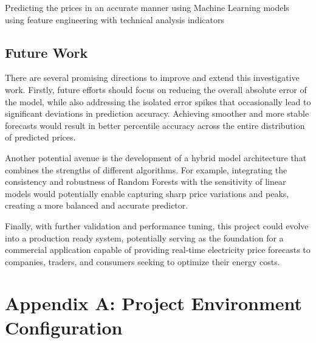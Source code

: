 \documentclass[12pt]{report} %
\begin{document}
Predicting the prices in an accurate manner using Machine Learning models using feature engineering with technical analysis indicators


\section{Future Work}
There are several promising directions to improve and extend this investigative work. Firstly, future efforts should focus on reducing the overall absolute error of the model, while also addressing the isolated error spikes that occasionally lead to significant deviations in prediction accuracy. Achieving smoother and more stable forecasts would result in better percentile accuracy across the entire distribution of predicted prices.

Another potential avenue is the development of a hybrid model architecture that combines the strengths of different algorithms. For example, integrating the consistency and robustness of Random Forests with the sensitivity of linear models would potentially enable capturing sharp price variations and peaks, creating a more balanced and accurate predictor.

Finally, with further validation and performance tuning, this project could evolve into a production ready system, potentially serving as the foundation for a commercial application capable of providing real-time electricity price forecasts to companies, traders, and consumers seeking to optimize their energy costs.



\clearpage
{}

\printbibliography



\appendix



\chapter* {Appendix A: Project Environment Configuration}
\label{app:appendix_a_env_setup}
\end{document}
